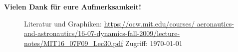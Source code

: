 \documentclass{beamer}
\begin{document}
\begin{frame}
\vfill

\centering \Large{\textbf{Vielen Dank für eure Aufmerksamkeit!}}\\[10ex]

\begin{figure}[b!]
\normalsize
\flushleft
\vfill
\small
Literatur und Graphiken: \url{https://ocw.mit.edu/courses/
aeronautics-and-astronautics/16-07-dynamics-fall-2009/lecture-notes/MIT16_07F09_Lec30.pdf} Zugriff: \today
\end{figure}
\end{frame}
\end{document}
